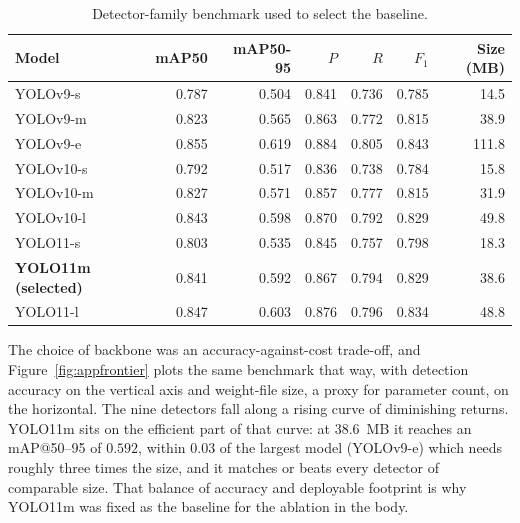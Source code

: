 \documentclass[12pt,a4paper,oneside]{report}
\begin{document}
\begin{table}[H]
  \centering
  \caption{Detector-family benchmark used to select the baseline.}
  \label{tab:appfamily}
  \setlength{\tabcolsep}{5pt}
  \begin{tabular}{@{}l r r r r r r@{}}
    \toprule
    Model & mAP50 & mAP50-95 & $P$ & $R$ & $F_1$ & Size (MB) \\
    \midrule
    YOLOv9-s   & 0.787 & 0.504 & 0.841 & 0.736 & 0.785 & 14.5 \\
    YOLOv9-m   & 0.823 & 0.565 & 0.863 & 0.772 & 0.815 & 38.9 \\
    YOLOv9-e   & 0.855 & 0.619 & 0.884 & 0.805 & 0.843 & 111.8 \\
    YOLOv10-s  & 0.792 & 0.517 & 0.836 & 0.738 & 0.784 & 15.8 \\
    YOLOv10-m  & 0.827 & 0.571 & 0.857 & 0.777 & 0.815 & 31.9 \\
    YOLOv10-l  & 0.843 & 0.598 & 0.870 & 0.792 & 0.829 & 49.8 \\
    YOLO11-s   & 0.803 & 0.535 & 0.845 & 0.757 & 0.798 & 18.3 \\
    \textbf{YOLO11m (selected)} & 0.841 & 0.592 & 0.867 & 0.794 & 0.829 & 38.6 \\
    YOLO11-l   & 0.847 & 0.603 & 0.876 & 0.796 & 0.834 & 48.8 \\
    \bottomrule
  \end{tabular}
\end{table}

The choice of backbone was an accuracy-against-cost trade-off, and
Figure~\ref{fig:appfrontier} plots the same benchmark that way, with detection
accuracy on the vertical axis and weight-file size, a proxy for parameter
count, on the horizontal. The nine detectors fall along a rising curve of
diminishing returns. YOLO11m sits on the efficient part of that curve: at
$38.6$~MB it reaches an mAP@50--95 of $0.592$, within $0.03$ of the largest
model (YOLOv9-e) which needs roughly three times the size, and it matches or
beats every detector of comparable size. That balance of accuracy and
deployable footprint is why YOLO11m was fixed as the baseline for the ablation
in the body.
\end{document}
